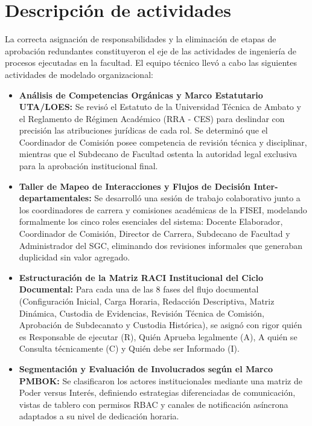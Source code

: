 \documentclass[12pt,a4paper]{article}
\begin{document}
\section{Descripción de actividades}
La correcta asignación de responsabilidades y la eliminación de etapas de aprobación redundantes constituyeron el eje de las actividades de ingeniería de procesos ejecutadas en la facultad. El equipo técnico llevó a cabo las siguientes actividades de modelado organizacional:

\begin{itemize}[leftmargin=1.5em, itemsep=4pt]
    \item \textbf{Análisis de Competencias Orgánicas y Marco Estatutario UTA/LOES:} Se revisó el Estatuto de la Universidad Técnica de Ambato y el Reglamento de Régimen Académico (RRA - CES) para deslindar con precisión las atribuciones jurídicas de cada rol. Se determinó que el Coordinador de Comisión posee competencia de revisión técnica y disciplinar, mientras que el Subdecano de Facultad ostenta la autoridad legal exclusiva para la aprobación institucional final.
    \item \textbf{Taller de Mapeo de Interacciones y Flujos de Decisión Inter-departamentales:} Se desarrolló una sesión de trabajo colaborativo junto a los coordinadores de carrera y comisiones académicas de la FISEI, modelando formalmente los cinco roles esenciales del sistema: Docente Elaborador, Coordinador de Comisión, Director de Carrera, Subdecano de Facultad y Administrador del SGC, eliminando dos revisiones informales que generaban duplicidad sin valor agregado.
    \item \textbf{Estructuración de la Matriz RACI Institucional del Ciclo Documental:} Para cada una de las 8 fases del flujo documental (Configuración Inicial, Carga Horaria, Redacción Descriptiva, Matriz Dinámica, Custodia de Evidencias, Revisión Técnica de Comisión, Aprobación de Subdecanato y Custodia Histórica), se asignó con rigor quién es Responsable de ejecutar (R), Quién Aprueba legalmente (A), A quién se Consulta técnicamente (C) y Quién debe ser Informado (I).
    \item \textbf{Segmentación y Evaluación de Involucrados según el Marco PMBOK:} Se clasificaron los actores institucionales mediante una matriz de Poder versus Interés, definiendo estrategias diferenciadas de comunicación, vistas de tablero con permisos RBAC y canales de notificación asíncrona adaptados a su nivel de dedicación horaria.
\end{itemize}
\end{document}
